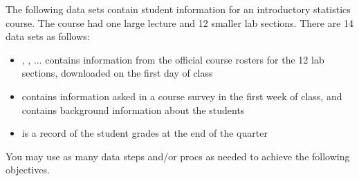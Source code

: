 






\noindent The following data sets contain student information for an introductory statistics course.  The course had one large lecture and 12 smaller lab sections.  There are 14 data sets as follows:
\begin{itemize}
\item {}, , ...  contains information from the official course rosters for the 12 lab sections, downloaded on the first day of class
\item {} contains information asked in a course survey in the first week of class, and contains background information about the students
\item {} is a record of the student grades at the end of the quarter
\end{itemize}
\noindent You may use as many data steps and/or procs as needed to achieve the following objectives.
